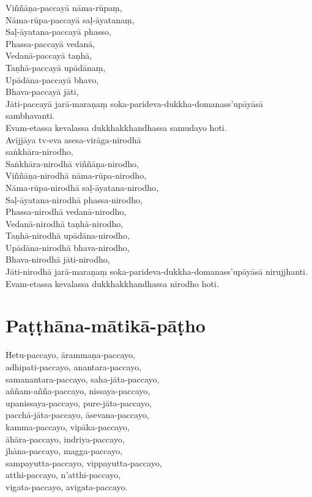 Viññāṇa-paccayā nāma-rūpaṃ,\\
Nāma-rūpa-paccayā saḷ-āyatanaṃ,\\
Saḷ-āyatana-paccayā phasso,\\
Phassa-paccayā vedanā,\\
Vedanā-paccayā taṇhā,\\
Taṇhā-paccayā upādānaṃ,\\
Upādāna-paccayā bhavo,\\
Bhava-paccayā jāti,\\
Jāti-paccayā jarā-maraṇaṃ soka-parideva-dukkha-domanass’upāyāsā sambhavanti.\\
Evam-etassa kevalassa dukkhakkhandhassa samudayo hoti.\\
Avijjāya tv-eva asesa-virāga-nirodhā\\
saṅkhāra-nirodho,\\
Saṅkhāra-nirodhā viññāṇa-nirodho,\\
Viññāṇa-nirodhā nāma-rūpa-nirodho,\\
Nāma-rūpa-nirodhā saḷ-āyatana-nirodho,\\
Saḷ-āyatana-nirodhā phassa-nirodho,\\
Phassa-nirodhā vedanā-nirodho,\\
Vedanā-nirodhā taṇhā-nirodho,\\
Taṇhā-nirodhā upādāna-nirodho,\\
Upādāna-nirodhā bhava-nirodho,\\
Bhava-nirodhā jāti-nirodho,\\
Jāti-nirodhā jarā-maraṇaṃ soka-parideva-dukkha-domanass’upāyāsā nirujjhanti.\\
Evam-etassa kevalassa dukkhakkhandhassa nirodho hoti.

\chapter{Paṭṭhāna-mātikā-pāṭho}

Hetu-paccayo, ārammaṇa-paccayo,\\
adhipati-paccayo, anantara-paccayo,\\
samanantara-paccayo, saha-jāta-paccayo,\\
aññam-añña-paccayo, nissaya-paccayo,\\
upanissaya-paccayo, pure-jāta-paccayo,\\
pacchā-jāta-paccayo, āsevana-paccayo,\\
kamma-paccayo, vipāka-paccayo,\\
āhāra-paccayo, indriya-paccayo,\\
jhāna-paccayo, magga-paccayo,\\
sampayutta-paccayo, vippayutta-paccayo,\\
atthi-paccayo, n’atthi-paccayo,\\
vigata-paccayo, avigata-paccayo.


